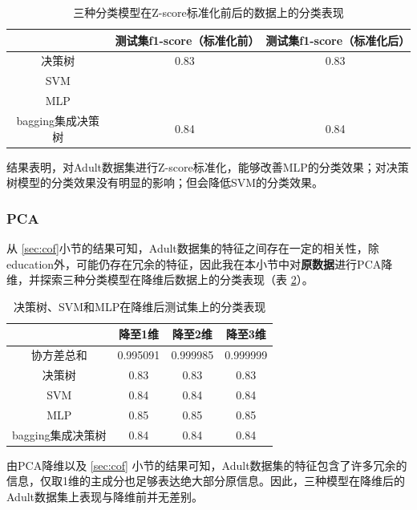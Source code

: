 \documentclass[12pt,a4paper]{article}
\theoremstyle{definition}
\begin{document}
\begin{table}[H]
	\renewcommand\arraystretch{1.5}
	\caption{三种分类模型在Z-score标准化前后的数据上的分类表现}
	\label{tab:norm}
	\centering
	
	\begin{tabular}{c|c|c}
		\centering
		 & 测试集f1-score（标准化前） & 测试集f1-score（标准化后） \\
		\hline
		\hline
		
		决策树 & 0.83 & 0.83 \\
		SVM & & \\
		MLP & & \\
		bagging集成决策树 & 0.84 & 0.84 \\

	\end{tabular}
\end{table}

结果表明，对Adult数据集进行Z-score标准化，能够改善MLP的分类效果；对决策树模型的分类效果没有明显的影响；但会降低SVM的分类效果。

\subsubsection{PCA}

从 \ref{sec:cof}小节的结果可知，Adult数据集的特征之间存在一定的相关性，除education外，可能仍存在冗余的特征，因此我在本小节中对\textbf{原数据}进行PCA降维，并探索三种分类模型在降维后数据上的分类表现（表 \ref{tab:pca1}）。

\begin{table}[H]
	\renewcommand\arraystretch{1.35}
	\caption{决策树、SVM和MLP在降维后测试集上的分类表现}
	\label{tab:pca1}
	\centering
	
	\begin{tabular}{c|c|c|c}
		\centering
		 & 降至1维 & 降至2维 & 降至3维 \\
		\hline
		\hline
		
		协方差总和 & 0.995091 & 0.999985 & 0.999999 \\
		决策树 & 0.83 & 0.83 & 0.83 \\
		SVM & 0.84 & 0.84 & 0.84 \\
		MLP & 0.85 & 0.85 & 0.85 \\
		bagging集成决策树 & 0.84 & 0.84 & 0.84 \\

	\end{tabular}
\end{table}

由PCA降维以及 \ref{sec:cof} 小节的结果可知，Adult数据集的特征包含了许多冗余的信息，仅取1维的主成分也足够表达绝大部分原信息。因此，三种模型在降维后的Adult数据集上表现与降维前并无差别。
\end{document}
